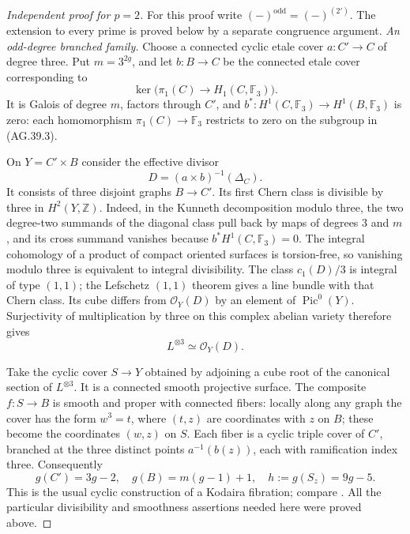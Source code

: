 \begin{proof}[Independent proof for \(p=2\)]
For this proof write \((-)^{\mathrm{odd}}=(-)^{(2')}\).
The extension to every prime is proved below by a separate
congruence argument.
\emph{An odd-degree branched family.}
Choose a connected cyclic etale cover
\(a:C'\to C\) of degree three. Put \(m=3^{2g}\), and let
\(b:B\to C\) be the connected etale cover corresponding to
\[
 \ker\bigl(\pi_1(C)\longrightarrow H_1(C,\mathbb F_3)\bigr).
                                                               \tag{AG.39.3}
\]
It is Galois of degree \(m\), factors through \(C'\), and
\(b^*:H^1(C,\mathbb F_3)\to H^1(B,\mathbb F_3)\) is zero:
each homomorphism \(\pi_1(C)\to\mathbb F_3\) restricts to
zero on the subgroup in (AG.39.3).

On \(Y=C'\times B\) consider the effective divisor
\[
          D=(a\times b)^{-1}(\Delta_C).
                                                               \tag{AG.39.4}
\]
It consists of three disjoint graphs \(B\to C'\). Its first
Chern class is divisible by three in \(H^2(Y,\mathbb Z)\).
Indeed, in the Kunneth decomposition modulo three, the two
degree-two summands of the diagonal class pull back by maps of
degrees \(3\) and \(m\), and its cross summand vanishes because
\(b^*H^1(C,\mathbb F_3)=0\). The integral cohomology of a
product of compact oriented surfaces is torsion-free, so vanishing
modulo three is equivalent to integral divisibility.
The class \(c_1(D)/3\) is integral of type \((1,1)\); the
Lefschetz \((1,1)\) theorem gives a line bundle with that Chern
class. Its cube differs from \(\mathcal O_Y(D)\) by an element
of \(\operatorname{Pic}^0(Y)\). Surjectivity of multiplication
by three on this complex abelian variety therefore gives
\[
                         L^{\otimes3}\simeq\mathcal O_Y(D).
                                                               \tag{AG.39.5}
\]

Take the cyclic cover \(S\to Y\) obtained by adjoining a cube
root of the canonical section of \(L^{\otimes3}\). It is a
connected smooth projective surface. The composite
\(f:S\to B\) is smooth and proper with connected fibers:
locally along any graph the cover has the form \(w^3=t\), where
\((t,z)\) are coordinates with \(z\) on \(B\); these become
the coordinates \((w,z)\) on \(S\). Each fiber is a cyclic
triple cover of \(C'\), branched at the three distinct points
\(a^{-1}(b(z))\), each with ramification index three. Consequently
\[
 g(C')=3g-2,\quad g(B)=m(g-1)+1,\quad
                  h:=g(S_z)=9g-5.                   \tag{AG.39.6}
\]
This is the usual cyclic construction of a Kodaira fibration;
compare \cite[Section 1.3]{AG_Rollenske2010}. All the particular
divisibility and smoothness assertions needed here were proved
above.


\end{proof}
